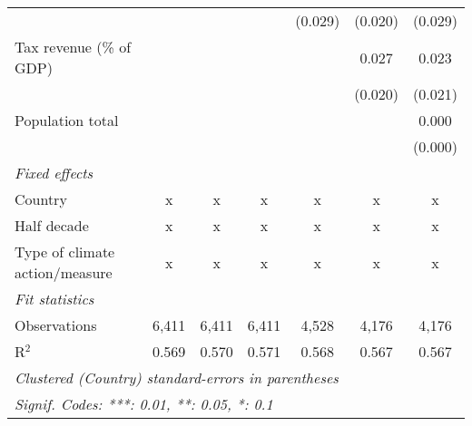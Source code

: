 \begin{tabular}{lcccccc}
                                                     &               &                &                & (0.029)        & (0.020)        & (0.029)\\   
   Tax revenue (\% of GDP)                           &               &                &                &                & 0.027          & 0.023\\   
                                                     &               &                &                &                & (0.020)        & (0.021)\\   
   Population total                                  &               &                &                &                &                & 0.000\\   
                                                     &               &                &                &                &                & (0.000)\\   
   \emph{Fixed effects}\\
   Country                                           & x             & x              & x              & x              & x              & x\\  
   Half decade                                       & x             & x              & x              & x              & x              & x\\  
   Type of climate action/measure                    & x             & x              & x              & x              & x              & x\\  
   \midrule \emph{Fit statistics}\\
   Observations                                      & 6,411         & 6,411          & 6,411          & 4,528          & 4,176          & 4,176\\  
   R$^2$                                             & 0.569         & 0.570          & 0.571          & 0.568          & 0.567          & 0.567\\  
   \midrule
   \multicolumn{7}{l}{\emph{Clustered (Country) standard-errors in parentheses}}\\
   \multicolumn{7}{l}{\emph{Signif. Codes: ***: 0.01, **: 0.05, *: 0.1}}\\
\end{tabular}
\par\endgroup


